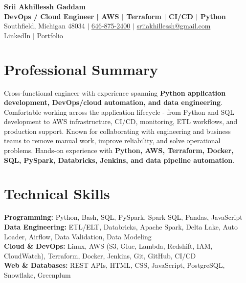 \documentclass[letterpaper,10pt]{article}
\begin{document}
\fontsize{9.35pt}{10.45pt}\selectfont

\begin{center}
    {\LARGE \textbf{Srii Akhillessh Gaddam}} \\[-1pt]
    \textbf{DevOps / Cloud Engineer | AWS | Terraform | CI/CD | Python} \\[2pt]
    Southfield, Michigan 48034 $|$
    \href{tel:6468752400}{646-875-2400} $|$
    \href{mailto:sriiakhillessh@gmail.com}{sriiakhillessh@gmail.com} \\[1pt]
    \href{https://www.linkedin.com/in/srii-akhiilessh-gaddam-b48668191/}{LinkedIn} $|$
    \href{https://sriiakhillesshg.github.io/portfolio/}{Portfolio}
\end{center}
\vspace{-8pt}

\section{Professional Summary}
\small{Cross-functional engineer with experience spanning \textbf{Python application development, DevOps/cloud automation, and data engineering}. Comfortable working across the application lifecycle - from Python and SQL development to AWS infrastructure, CI/CD, monitoring, ETL workflows, and production support. Known for collaborating with engineering and business teams to remove manual work, improve reliability, and solve operational problems. Hands-on experience with \textbf{Python, AWS, Terraform, Docker, SQL, PySpark, Databricks, Jenkins, and data pipeline automation}.}

\section{Technical Skills}
\small{
\textbf{Programming:} Python, Bash, SQL, PySpark, Spark SQL, Pandas, JavaScript \\
\textbf{Data Engineering:} ETL/ELT, Databricks, Apache Spark, Delta Lake, Auto Loader, Airflow, Data Validation, Data Modeling \\
\textbf{Cloud \& DevOps:} Linux, AWS (S3, Glue, Lambda, Redshift, IAM, CloudWatch), Terraform, Docker, Jenkins, Git, GitHub, CI/CD \\
\textbf{Web \& Databases:} REST APIs, HTML, CSS, JavaScript, PostgreSQL, Snowflake, Greenplum
}
\end{document}
